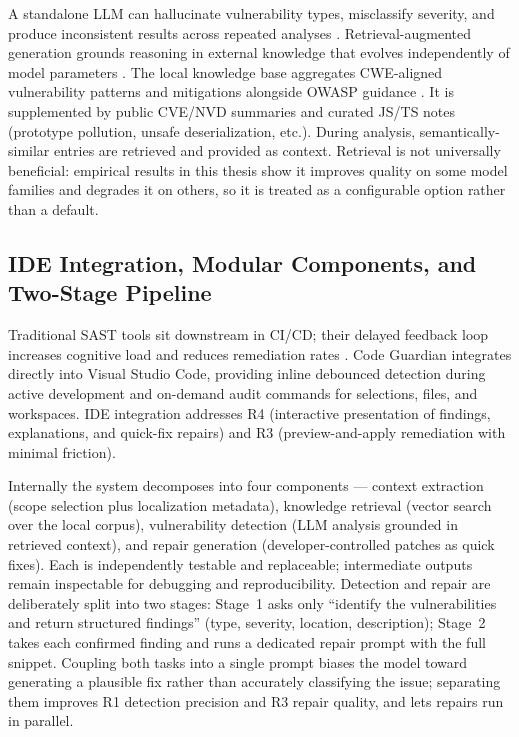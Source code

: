 A standalone LLM can hallucinate vulnerability types, misclassify severity, and produce inconsistent results across repeated analyses \cite{ji2023hallucination}. Retrieval-augmented generation grounds reasoning in external knowledge that evolves independently of model parameters \cite{lewis2020rag,karpukhin2020dpr}. The local knowledge base aggregates CWE-aligned vulnerability patterns and mitigations alongside OWASP guidance \cite{mitreCWE,owaspTop10_2021}. It is supplemented by public CVE/NVD summaries \cite{mitreCVE,nistNVD} and curated JS/TS notes (prototype pollution, unsafe deserialization, etc.). During analysis, semantically-similar entries are retrieved and provided as context. Retrieval is not universally beneficial: empirical results in this thesis show it improves quality on some model families and degrades it on others, so it is treated as a configurable option rather than a default.

\subsection{IDE Integration, Modular Components, and Two-Stage Pipeline}
\label{subsec:ide-modular-pipeline}

Traditional SAST tools sit downstream in CI/CD; their delayed feedback loop increases cognitive load and reduces remediation rates \cite{johnson2013don,christakis2016developers}. Code Guardian integrates directly into Visual Studio Code, providing inline debounced detection during active development and on-demand audit commands for selections, files, and workspaces. IDE integration addresses R4 (interactive presentation of findings, explanations, and quick-fix repairs) and R3 (preview-and-apply remediation with minimal friction).

Internally the system decomposes into four components --- context extraction (scope selection plus localization metadata), knowledge retrieval (vector search over the local corpus), vulnerability detection (LLM analysis grounded in retrieved context), and repair generation (developer-controlled patches as quick fixes). Each is independently testable and replaceable; intermediate outputs remain inspectable for debugging and reproducibility. Detection and repair are deliberately split into two stages: Stage~1 asks only ``identify the vulnerabilities and return structured findings'' (type, severity, location, description); Stage~2 takes each confirmed finding and runs a dedicated repair prompt with the full snippet. Coupling both tasks into a single prompt biases the model toward generating a plausible fix rather than accurately classifying the issue; separating them improves R1 detection precision and R3 repair quality, and lets repairs run in parallel.

